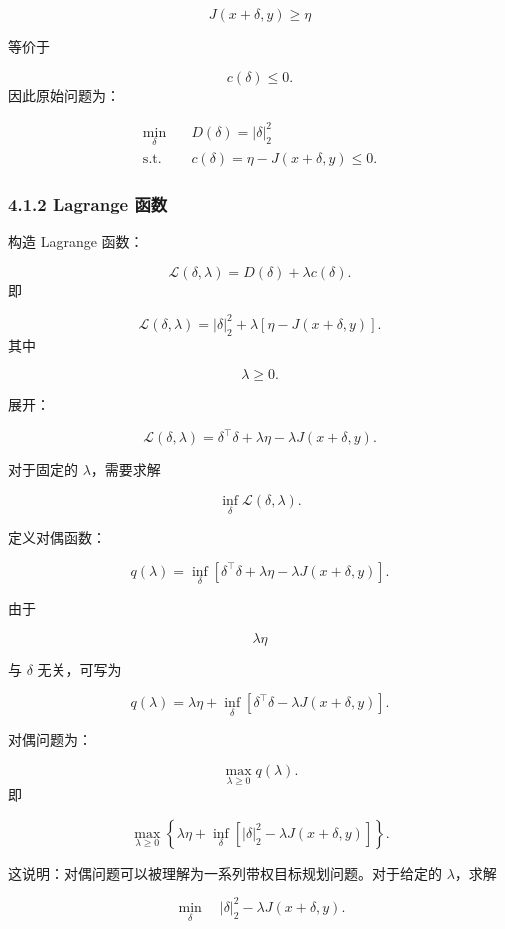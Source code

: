 ﻿\documentclass[UTF8,zihao=-4,fontset=none]{ctexart}
\begin{document}
\[
J(x+\delta,y)\ge \eta
\]

等价于

\[
c(\delta)\le 0.
\]
\noindent 因此原始问题为：

\[
\begin{aligned}
\min_{\delta}
\quad
&
D(\delta)=|\delta|_2^2\\
\mathrm{s.t.}
\quad
&
c(\delta)=\eta-J(x+\delta,y)\le 0.
\end{aligned}
\]

\subsubsection*{4.1.2 Lagrange 函数}
{}

构造 Lagrange 函数：

\[
\mathcal{L}(\delta,\lambda)
=
D(\delta)+\lambda c(\delta).
\]
\noindent 即

\[
\mathcal{L}(\delta,\lambda)
=
|\delta|_2^2
+
\lambda[\eta-J(x+\delta,y)].
\]
\noindent 其中

\[
\lambda\ge 0.
\]

展开：

\[
\mathcal{L}(\delta,\lambda)
=
\delta^\top\delta
+
\lambda\eta
-
\lambda J(x+\delta,y).
\]

对于固定的 \(\lambda\)，需要求解

\[
\inf_{\delta}\mathcal{L}(\delta,\lambda).
\]

定义对偶函数：

\[
q(\lambda)
=
\inf_{\delta}
\left[
\delta^\top\delta
+
\lambda\eta
-
\lambda J(x+\delta,y)
\right].
\]

由于

\[
\lambda\eta
\]

与 \(\delta\) 无关，可写为

\[
q(\lambda)
=
\lambda\eta
+
\inf_{\delta}
\left[
\delta^\top\delta
-
\lambda J(x+\delta,y)
\right].
\]

对偶问题为：

\[
\max_{\lambda\ge 0}q(\lambda).
\]
\noindent 即

\[
\max_{\lambda\ge 0}
\left\{
\lambda\eta
+
\inf_{\delta}
\left[
|\delta|_2^2
-
\lambda J(x+\delta,y)
\right]
\right\}.
\]

这说明：对偶问题可以被理解为一系列带权目标规划问题。对于给定的 \(\lambda\)，求解

\[
\min_{\delta}
\quad
|\delta|_2^2
-
\lambda J(x+\delta,y).
\]
\end{document}
